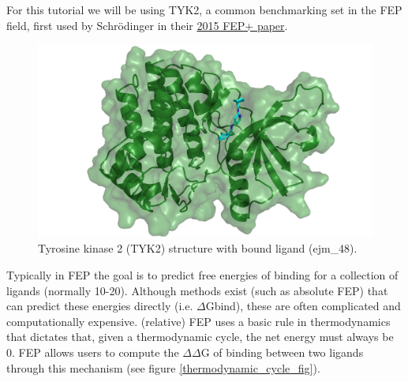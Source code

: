 For this tutorial we will be using TYK2, a common benchmarking set in
the FEP field, first used by Schrödinger in their
\href{https://pubs.acs.org/doi/abs/10.1021/ja512751q}{2015 FEP+ paper}.

\begin{figure}[htp]
\includegraphics[width=\linewidth]{04_fep/inputs/tut_imgs/tyk2_protlig.png}
\caption{Tyrosine kinase 2 (TYK2) structure with bound ligand
(ejm\_48).}
\label{tyk2_bound_fig}
\end{figure}


Typically in FEP the goal is to predict free energies of binding for a
collection of ligands (normally 10-20). Although methods exist (such as
absolute FEP) that can predict these energies directly (i.e. $\Delta$Gbind),
these are often complicated and computationally expensive. (relative)
FEP uses a basic rule in thermodynamics that dictates that, given a
thermodynamic cycle, the net energy must always be 0. FEP allows users
to compute the $\Delta\Delta$G of binding between two ligands through this mechanism
(see figure \ref{thermodynamic_cycle_fig}).

